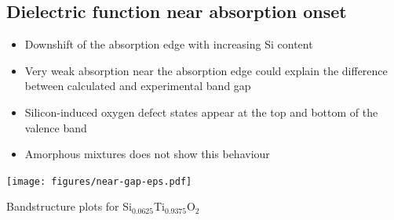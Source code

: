 \documentclass[blues]{poster}
\begin{document}
\begin{multicols}{2}
\subsection{Dielectric function near absorption onset}

\begin{minipage}{0.5\linewidth}   

\begin{itemize}
\item{Downshift of the absorption edge with increasing Si content}
\item{Very weak absorption near the absorption edge could explain the difference between calculated and experimental band gap}
\item{Silicon-induced oxygen defect states appear at the top and bottom of the valence band}
\item{Amorphous mixtures does not show this behaviour}
\end{itemize}

\end{minipage}
\begin{minipage}{0.5\linewidth}
\texttt{[image: figures/near-gap-eps.pdf]}
\end{minipage}

\renewcommand{\familydefault}{\sfdefault}
\normalfont

\begin{center}
Bandstructure plots for Si$_{0.0625}$Ti$_{0.9375}$O$_2$
\end{center}


\end{multicols}
\end{document}

